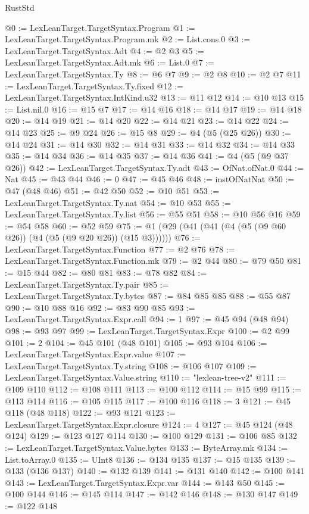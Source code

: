 \begin{lexlean}{RustStd}
\begin{coremodule}
@0 := LexLeanTarget.TargetSyntax.Program
@1 := LexLeanTarget.TargetSyntax.Program.mk
@2 := List.cons.{0}
@3 := LexLeanTarget.TargetSyntax.Adt
@4 := @2 @3
@5 := LexLeanTarget.TargetSyntax.Adt.mk
@6 := List.{0}
@7 := LexLeanTarget.TargetSyntax.Ty
@8 := @6 @7
@9 := @2 @8
@10 := @2 @7
@11 := LexLeanTarget.TargetSyntax.Ty.fixed
@12 := LexLeanTarget.TargetSyntax.IntKind.u32
@13 := @11 @12
@14 := @10 @13
@15 := List.nil.{0}
@16 := @15 @7
@17 := @14 @16
@18 := @14 @17
@19 := @14 @18
@20 := @14 @19
@21 := @14 @20
@22 := @14 @21
@23 := @14 @22
@24 := @14 @23
@25 := @9 @24
@26 := @15 @8
@29 := @4 (@5 (@25 @26))
@30 := @14 @24
@31 := @14 @30
@32 := @14 @31
@33 := @14 @32
@34 := @14 @33
@35 := @14 @34
@36 := @14 @35
@37 := @14 @36
@41 := @4 (@5 (@9 @37 @26))
@42 := LexLeanTarget.TargetSyntax.Ty.adt
@43 := OfNat.ofNat.{0}
@44 := Nat
@45 := @43 @44
@46 := 0
@47 := @45 @46
@48 := instOfNatNat
@50 := @47 (@48 @46)
@51 := @42 @50
@52 := @10 @51
@53 := LexLeanTarget.TargetSyntax.Ty.nat
@54 := @10 @53
@55 := LexLeanTarget.TargetSyntax.Ty.list
@56 := @55 @51
@58 := @10 @56 @16
@59 := @54 @58
@60 := @52 @59
@75 := @1 (@29 (@41 (@41 (@4 (@5 (@9 @60 @26)) (@4 (@5 (@9 @20 @26)) (@15 @3))))))
@76 := LexLeanTarget.TargetSyntax.Function
@77 := @2 @76
@78 := LexLeanTarget.TargetSyntax.Function.mk
@79 := @2 @44
@80 := @79 @50
@81 := @15 @44
@82 := @80 @81
@83 := @78 @82
@84 := LexLeanTarget.TargetSyntax.Ty.pair
@85 := LexLeanTarget.TargetSyntax.Ty.bytes
@87 := @84 @85 @85
@88 := @55 @87
@90 := @10 @88 @16
@92 := @83 @90 @85
@93 := LexLeanTarget.TargetSyntax.Expr.call
@94 := 1
@97 := @45 @94 (@48 @94)
@98 := @93 @97
@99 := LexLeanTarget.TargetSyntax.Expr
@100 := @2 @99
@101 := 2
@104 := @45 @101 (@48 @101)
@105 := @93 @104
@106 := LexLeanTarget.TargetSyntax.Expr.value
@107 := LexLeanTarget.TargetSyntax.Ty.string
@108 := @106 @107
@109 := LexLeanTarget.TargetSyntax.Value.string
@110 := "lexlean-tree-v2"
@111 := @109 @110
@112 := @108 @111
@113 := @100 @112
@114 := @15 @99
@115 := @113 @114
@116 := @105 @115
@117 := @100 @116
@118 := 3
@121 := @45 @118 (@48 @118)
@122 := @93 @121
@123 := LexLeanTarget.TargetSyntax.Expr.closure
@124 := 4
@127 := @45 @124 (@48 @124)
@129 := @123 @127 @114
@130 := @100 @129
@131 := @106 @85
@132 := LexLeanTarget.TargetSyntax.Value.bytes
@133 := ByteArray.mk
@134 := List.toArray.{0}
@135 := UInt8
@136 := @134 @135
@137 := @15 @135
@139 := @133 (@136 @137)
@140 := @132 @139
@141 := @131 @140
@142 := @100 @141
@143 := LexLeanTarget.TargetSyntax.Expr.var
@144 := @143 @50
@145 := @100 @144
@146 := @145 @114
@147 := @142 @146
@148 := @130 @147
@149 := @122 @148

\end{coremodule}
\end{lexlean}
